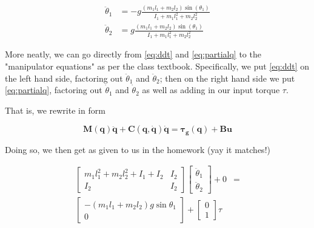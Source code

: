 \documentclass[conference]{IEEEtran}
\begin{document}
\begin{align}
    \ddot \theta_1 &= -g \frac{ (m_1 l_1 + m_2 l_2) \sin(\theta_1)}
        {I_1 + m_1 l_1^2 + m_2 l_2^2} \\
    \ddot \theta_2 &= g \frac{ (m_1 l_1 + m_2 l_2) \sin(\theta_1) }
        {I_1 + m_1 l_1^2 + m_2 l_2^2}
\end{align}

More neatly, we can go directly from \cref{eq:ddt} and
\cref{eq:partialq} to the "manipulator equations" as per the class textbook.
Specifically, we put \cref{eq:ddt} on the left hand side, factoring out
$\ddot \theta_1$ and $\ddot \theta_2$; then on the right hand side we put
\cref{eq:partialq}, factoring out $\dot \theta_1$ and $\dot \theta_2$ as well as
adding in our input torque $\tau$.

That is, we rewrite in form

\begin{equation}
\bm{M(q) \ddot q + C (q, \dot q) \dot q = \tau_g (q) + B u}
\end{equation}

Doing so, we then get as given to us in the homework
(yay it matches!)

\begin{align}
    \begin{bmatrix}
        m_1 l_1 ^2 + m_2 l_2^2 + I_1 + I_2 & I_2 \\
        I_2 & I_2
    \end{bmatrix}
    \begin{bmatrix}
        \ddot \theta_1 \\
        \ddot \theta_2
    \end{bmatrix}
    + 0
    &= \nonumber \\
    \begin{bmatrix}
        - (m_1 l_1 + m_2 l_2) g \sin\theta_1 \\
        0
    \end{bmatrix}
     +
     \begin{bmatrix}
         0 \\
         1
     \end{bmatrix}
     \tau
\end{align}



\end{document}

